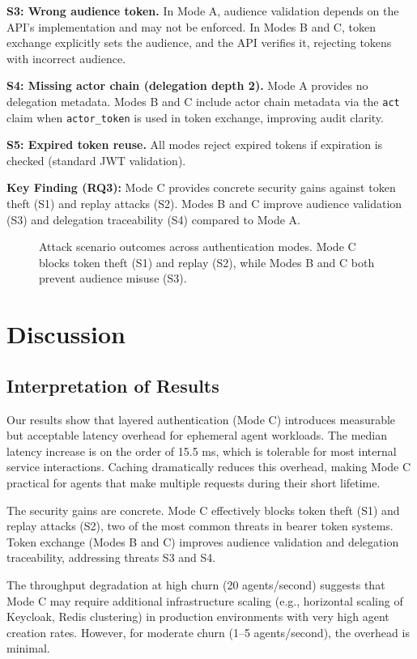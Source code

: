 \documentclass[conference,10pt]{IEEEtran}
\begin{document}
\textbf{S3: Wrong audience token.} In Mode A, audience validation depends on the API's implementation and may not be enforced. In Modes B and C, token exchange explicitly sets the audience, and the API verifies it, rejecting tokens with incorrect audience.

\textbf{S4: Missing actor chain (delegation depth 2).} Mode A provides no delegation metadata. Modes B and C include actor chain metadata via the \texttt{act} claim when \texttt{actor\_token} is used in token exchange, improving audit clarity.

\textbf{S5: Expired token reuse.} All modes reject expired tokens if expiration is checked (standard JWT validation).

\textbf{Key Finding (RQ3):} Mode C provides concrete security gains against token theft (S1) and replay attacks (S2). Modes B and C improve audience validation (S3) and delegation traceability (S4) compared to Mode A.

\begin{figure}[t]
\centering

\caption{Attack scenario outcomes across authentication modes. Mode C blocks token theft (S1) and replay (S2), while Modes B and C both prevent audience misuse (S3).}
\label{tab:attacks}
\end{figure}

\section{Discussion}

\subsection{Interpretation of Results}

Our results show that layered authentication (Mode C) introduces measurable but acceptable latency overhead for ephemeral agent workloads. The median latency increase is on the order of 15.5 ms, which is tolerable for most internal service interactions. Caching dramatically reduces this overhead, making Mode C practical for agents that make multiple requests during their short lifetime.

The security gains are concrete. Mode C effectively blocks token theft (S1) and replay attacks (S2), two of the most common threats in bearer token systems. Token exchange (Modes B and C) improves audience validation and delegation traceability, addressing threats S3 and S4.

The throughput degradation at high churn (20 agents/second) suggests that Mode C may require additional infrastructure scaling (e.g., horizontal scaling of Keycloak, Redis clustering) in production environments with very high agent creation rates. However, for moderate churn (1--5 agents/second), the overhead is minimal.
\end{document}
